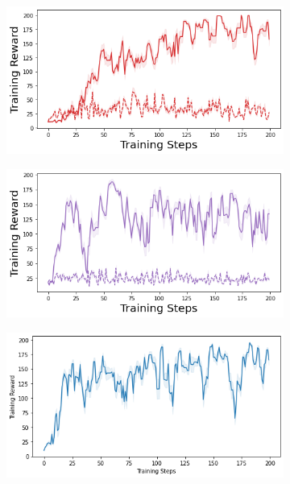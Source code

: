 \begin{figure}
    \begin{subfigure}{.24\textwidth}
        \includegraphics[width=\textwidth]{sections/011_icml2022/resources/cartpole-training_total_reward-dropout-training-strategy.png}
    \end{subfigure}
    \begin{subfigure}{.24\textwidth}
        \includegraphics[width=\textwidth]{sections/011_icml2022/resources/cartpole-training_total_reward-ensemble-training-strategy.png}
    \end{subfigure}
    \begin{subfigure}{.24\textwidth}
        \includegraphics[width=\textwidth]{sections/011_icml2022/resources/cartpole-training_total_reward-dkl-training-strategy.png}

\end{subfigure}
\end{figure}
